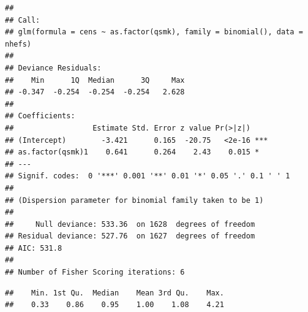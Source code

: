 \documentclass[
  10pt,
]{book}
\newenvironment{Shaded}{\begin{snugshade}}{\end{snugshade}}
\newcommand{\DataTypeTok}[1]{\textcolor[rgb]{0.13,0.29,0.53}{#1}}
\newcommand{\DecValTok}[1]{\textcolor[rgb]{0.00,0.00,0.81}{#1}}
\newcommand{\KeywordTok}[1]{\textcolor[rgb]{0.13,0.29,0.53}{\textbf{#1}}}
\newcommand{\NormalTok}[1]{#1}
\newcommand{\OperatorTok}[1]{\textcolor[rgb]{0.81,0.36,0.00}{\textbf{#1}}}
\newcommand{\StringTok}[1]{\textcolor[rgb]{0.31,0.60,0.02}{#1}}
\begin{document}
\begin{verbatim}
## 
## Call:
## glm(formula = cens ~ as.factor(qsmk), family = binomial(), data = nhefs)
## 
## Deviance Residuals: 
##    Min      1Q  Median      3Q     Max  
## -0.347  -0.254  -0.254  -0.254   2.628  
## 
## Coefficients:
##                  Estimate Std. Error z value Pr(>|z|)    
## (Intercept)        -3.421      0.165  -20.75   <2e-16 ***
## as.factor(qsmk)1    0.641      0.264    2.43    0.015 *  
## ---
## Signif. codes:  0 '***' 0.001 '**' 0.01 '*' 0.05 '.' 0.1 ' ' 1
## 
## (Dispersion parameter for binomial family taken to be 1)
## 
##     Null deviance: 533.36  on 1628  degrees of freedom
## Residual deviance: 527.76  on 1627  degrees of freedom
## AIC: 531.8
## 
## Number of Fisher Scoring iterations: 6
\end{verbatim}

\begin{Shaded}
\end{Shaded}

\begin{verbatim}
##    Min. 1st Qu.  Median    Mean 3rd Qu.    Max. 
##    0.33    0.86    0.95    1.00    1.08    4.21
\end{verbatim}

\begin{Shaded}
\end{Shaded}
\end{document}

